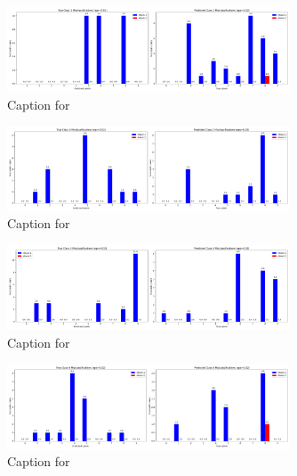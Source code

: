 \documentclass{article}
\begin{document}
\begin{figure}[!htbp]
\centering
\includegraphics[width=0.75\textwidth]{combined_class_boundary_pgd/combined_class_1_misclassifications_eps_0.02.png}
\caption{Caption for }
\label{fig:combined_class_1_misclassifications_eps_0.02.png}
\end{figure}

\begin{figure}[!htbp]
\centering
\includegraphics[width=0.75\textwidth]{combined_class_boundary_pgd/combined_class_3_misclassifications_eps_0.02.png}
\caption{Caption for }
\label{fig:combined_class_3_misclassifications_eps_0.02.png}
\end{figure}

\begin{figure}[!htbp]
\centering
\includegraphics[width=0.75\textwidth]{combined_class_boundary_pgd/combined_class_4_misclassifications_eps_0.02.png}
\caption{Caption for }
\label{fig:combined_class_4_misclassifications_eps_0.02.png}
\end{figure}

\begin{figure}[!htbp]
\centering
\includegraphics[width=0.75\textwidth]{combined_class_boundary_pgd/combined_class_6_misclassifications_eps_0.02.png}
\caption{Caption for }
\label{fig:combined_class_6_misclassifications_eps_0.02.png}
\end{figure}
\end{document}
